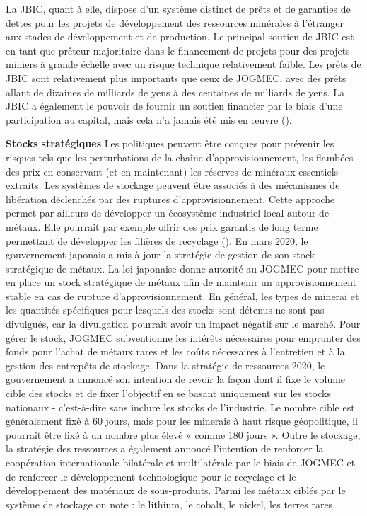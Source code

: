La JBIC, quant à elle, dispose d'un système distinct de prêts et de garanties de dettes pour les projets de développement des ressources minérales à l'étranger aux stades de développement et de production. Le principal soutien de JBIC est en tant que prêteur majoritaire dans le financement de projets pour des projets miniers à grande échelle avec un risque technique relativement faible. Les prêts de JBIC sont relativement plus importants que ceux de JOGMEC, avec des prêts allant de dizaines de milliards de yens à des centaines de milliards de yens. La JBIC a également le pouvoir de fournir un soutien financier par le biais d'une participation au capital, mais cela n'a jamais été mis en œuvre (\cite{noauthor_jogmec_2021}).\bigbreak

\textbf{Stocks stratégiques}\smallbreak
Les politiques peuvent être conçues pour prévenir les risques tels que les perturbations de la chaîne d'approvisionnement, les flambées des prix en conservant (et en maintenant) les réserves de minéraux essentiels extraits. Les systèmes de stockage peuvent être associés à des mécanismes de libération déclenchés par des ruptures d'approvisionnement. Cette approche permet par ailleurs de développer un écosystème industriel local autour de métaux. Elle pourrait par exemple offrir des prix garantis de long terme permettant de développer les filières de recyclage (\cite{donnen_vers_2022}).\smallbreak
En mars 2020, le gouvernement japonais a mis à jour la stratégie de gestion de son stock stratégique de métaux. La loi japonaise donne autorité au JOGMEC pour mettre en place un stock stratégique de métaux afin de maintenir un approvisionnement stable en cas de rupture d'approvisionnement. En général, les types de minerai et les quantités spécifiques pour lesquels des stocks sont détenus ne sont pas divulgués, car la divulgation pourrait avoir un impact négatif sur le marché. Pour gérer le stock, JOGMEC subventionne les intérêts nécessaires pour emprunter des fonds pour l'achat de métaux rares et les coûts nécessaires à l'entretien et à la gestion des entrepôts de stockage.\smallbreak
Dans la stratégie de ressources 2020, le gouvernement a annoncé son intention de revoir la façon dont il fixe le volume cible des stocks et de fixer l'objectif en se basant uniquement sur les stocks nationaux - c'est-à-dire sans inclure les stocks de l'industrie. Le nombre cible est généralement fixé à 60 jours, mais pour les minerais à haut risque géopolitique, il pourrait être fixé à un nombre plus élevé « comme 180 jours ».\smallbreak
Outre le stockage, la stratégie des ressources a également annoncé l'intention de renforcer la coopération internationale bilatérale et multilatérale par le biais de JOGMEC et de renforcer le développement technologique pour le recyclage et le développement des matériaux de sous-produits. Parmi les métaux ciblés par le système de stockage on note : le lithium, le cobalt, le nickel, les terres rares.
